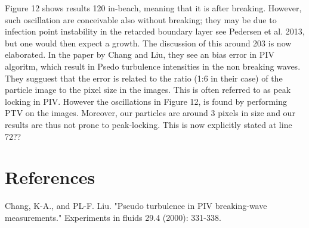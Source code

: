 \documentclass[11pt]{article}
\begin{document}
Figure 12 shows results 120 in-beach, meaning that it is after breaking. However, such oscillation are conceivable also without breaking; they may be due to infection point instability in the retarded boundary layer see Pedersen et al. 2013, but one would then expect a growth. The discussion of this around 203 is now elaborated. 
 In the paper by Chang and Liu, they see an bias error in PIV algoritm, which result in Psedo turbulence intensities in the non breaking waves. They sugguest that the error is related to the ratio (1:6 in their case) of the particle image to the pixel size in the images. This is often referred to as peak locking in PIV. However the oscillations in Figure 12, is found by  performing PTV on the images. Moreover, our particles are around 3 pixels in size and
our results are thus not prone to peak-locking. This is now explicitly stated
at line 72?? 



\section*{References}



Chang, K-A., and PL-F. Liu. "Pseudo turbulence in PIV breaking-wave measurements." Experiments in fluids 29.4 (2000): 331-338.
\end{document}
